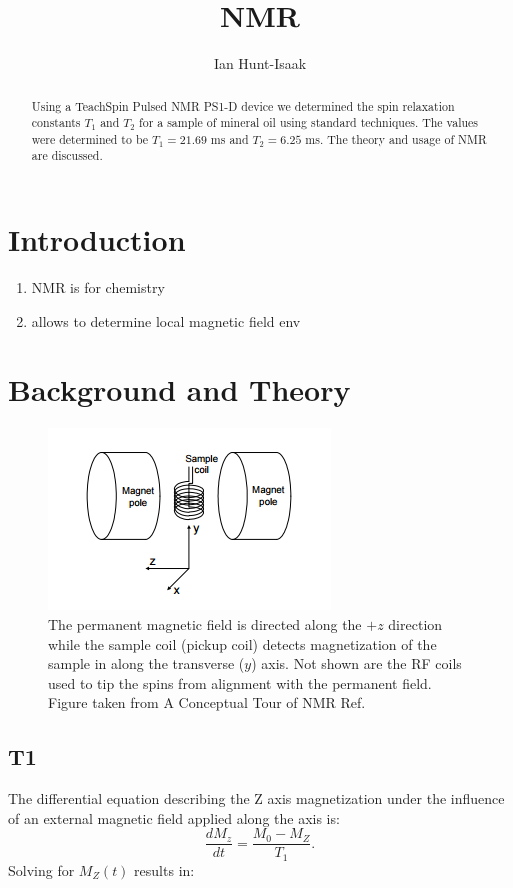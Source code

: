 \documentclass[11pt,letterpaper]{article}
\title{NMR}
\date{}
\author{Ian Hunt-Isaak}
\begin{document}
\maketitle
\begin{abstract}
Using a TeachSpin Pulsed NMR PS1-D device we determined the spin relaxation constants $T_1$ and $T_2$ for a sample of mineral oil using standard techniques. The values were determined to be $T_1=21.69$ ms and $T_2=6.25$ ms. The theory and usage of NMR are discussed.
\end{abstract}
\section{Introduction}
\begin{enumerate}
\item NMR is for chemistry
\item allows to determine local magnetic field env
\end{enumerate}
\section{Background and Theory}

\begin{figure}[h!]
  \centering
      \includegraphics[scale=.4]{Sample_Env.png}
      \caption{The permanent magnetic field is directed along the $+z$ direction while the sample coil (pickup coil) detects magnetization of the sample in along the transverse ($y$) axis. Not shown are the RF coils used to tip the spins from alignment with the permanent field. Figure taken from A Conceptual Tour of NMR Ref. \cite{Concept_Tour}}
      \label{fig:Sample_Env}
\end{figure}
\subsection{T1}
\label{sub:T1_Theory}
The differential equation describing the Z axis magnetization under the influence of an external magnetic field applied along the axis is:
\begin{equation}
	\frac{dM_z}{dt}=\frac{M_0 - M_Z}{T_1}.
\end{equation}
Solving for $M_Z(t)$ results in:
\end{document}
